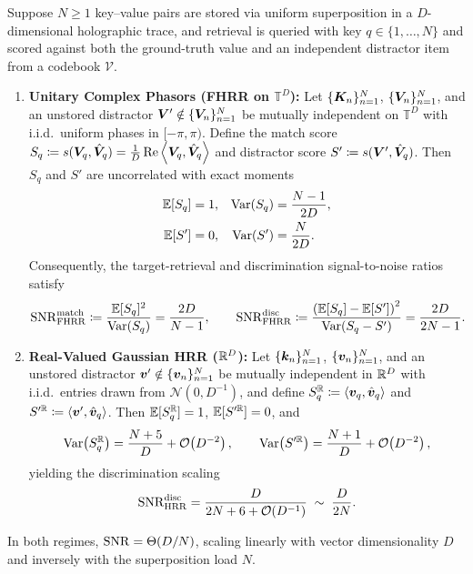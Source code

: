 \begin{theorem}\label{thm:snr_capacity}
Suppose $N \ge 1$ key--value pairs are stored via uniform superposition in a $D$-dimensional holographic trace, and retrieval is queried with key $q \in \{1, \dots, N\}$ and scored against both the ground-truth value and an independent distractor item from a codebook $\mathcal{V}$.
\begin{enumerate}
    \item \textbf{Unitary Complex Phasors (FHRR on $\mathbb{T}^D$):}
    Let $\{\boldsymbol{K}_n\}_{n=1}^N$, $\{\boldsymbol{V}_n\}_{n=1}^N$, and an unstored distractor $\boldsymbol{V}' \notin \{\boldsymbol{V}_n\}_{n=1}^N$ be mutually independent on $\mathbb{T}^D$ with i.i.d.\ uniform phases in $[-\pi, \pi)$.
    Define the match score $S_q \coloneqq s(\boldsymbol{V}_q, \hat{\boldsymbol{V}}_q) = \frac{1}{D}\operatorname{Re}\left\langle \boldsymbol{V}_q, \hat{\boldsymbol{V}}_q \right\rangle$ and distractor score $S' \coloneqq s(\boldsymbol{V}', \hat{\boldsymbol{V}}_q)$.
    Then $S_q$ and $S'$ are uncorrelated with exact moments
    \begin{align}
        \mathbb{E}[S_q] &= 1, & \operatorname{Var}(S_q) &= \frac{N - 1}{2D}, \label{eq:fhrr_match_var} \\
        \mathbb{E}[S'] &= 0, & \operatorname{Var}(S') &= \frac{N}{2D}. \label{eq:fhrr_distractor_var}
    \end{align}
    Consequently, the target-retrieval and discrimination signal-to-noise ratios satisfy
    \begin{equation}\label{eq:snr_fhrr}
        \mathrm{SNR}_{\mathrm{FHRR}}^{\mathrm{match}}
        \coloneqq \frac{\mathbb{E}[S_q]^2}{\operatorname{Var}(S_q)} = \frac{2D}{N - 1},
        \qquad
        \mathrm{SNR}_{\mathrm{FHRR}}^{\mathrm{disc}}
        \coloneqq \frac{\left(\mathbb{E}[S_q] - \mathbb{E}[S']\right)^2}{\operatorname{Var}(S_q - S')} = \frac{2D}{2N - 1}.
    \end{equation}

    \item \textbf{Real-Valued Gaussian HRR ($\mathbb{R}^D$):}
    Let $\{\boldsymbol{k}_n\}_{n=1}^N$, $\{\boldsymbol{v}_n\}_{n=1}^N$, and an unstored distractor $\boldsymbol{v}' \notin \{\boldsymbol{v}_n\}_{n=1}^N$ be mutually independent in $\mathbb{R}^D$ with i.i.d.\ entries drawn from $\mathcal{N}(0, D^{-1})$, and define $S_q^{\mathbb{R}} \coloneqq \left\langle \boldsymbol{v}_q, \hat{\boldsymbol{v}}_q \right\rangle$ and $S'^{\mathbb{R}} \coloneqq \left\langle \boldsymbol{v}', \hat{\boldsymbol{v}}_q \right\rangle$.
    Then $\mathbb{E}[S_q^{\mathbb{R}}] = 1$, $\mathbb{E}[S'^{\mathbb{R}}] = 0$, and
    \begin{equation}\label{eq:hrr_vars}
        \operatorname{Var}\!\left(S_q^{\mathbb{R}}\right) = \frac{N + 5}{D} + \mathcal{O}\!\left(D^{-2}\right),
        \qquad
        \operatorname{Var}\!\left(S'^{\mathbb{R}}\right) = \frac{N + 1}{D} + \mathcal{O}\!\left(D^{-2}\right),
    \end{equation}
    yielding the discrimination scaling
    \begin{equation}\label{eq:snr_hrr}
        \mathrm{SNR}_{\mathrm{HRR}}^{\mathrm{disc}}
        = \frac{D}{2N + 6 + \mathcal{O}\!\left(D^{-1}\right)} \;\sim\; \frac{D}{2N}.
    \end{equation}
\end{enumerate}
In both regimes, $\mathrm{SNR} = \Theta(D/N)$, scaling linearly with vector dimensionality $D$ and inversely with the superposition load $N$.
\end{theorem}

